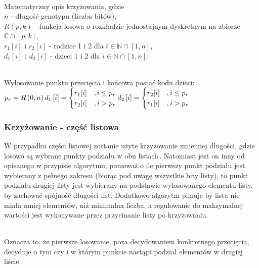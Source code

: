 \noindent\\
Matematyczny opis krzyżowania, gdzie\\
$n$ - długość genotypu (liczba bitów),\\
$R\left(p, k\right)$ - funkcja losowa o rozkładzie jednostajnym dyskretnym
  na zbiorze $\mathbb{C} \cap \left[p, k\right]$,\\
$r_1\left[i\right]$ i $r_2\left[i\right]$ -
  rodzice 1 i 2 dla
  $i \in \mathbb{N} \cap \left[1, n\right]$,\\
$d_1\left[i\right]$ i $d_2\left[i\right]$ -
  dzieci 1 i 2 dla
  $i \in \mathbb{N} \cap \left[1, n\right]$:

\noindent\\
Wylosowanie punktu przecięcia i końcowa postać kodu dzieci:\\
$\displaystyle
  p_r=R\left(0, n\right)\\
  d_1\left[i\right]=\begin{cases}
    r_1[i]
      &, i \le p_r\\
    r_2[i]
      &, i>p_r\\
  \end{cases}\\
  d_2\left[i\right]=\begin{cases}
    r_2[i]
      &, i \le p_r\\
    r_1[i]
      &, i>p_r\\
  \end{cases}
$

\subsubsection{Krzyżowanie - część listowa}
W przypadku części listowej zostanie użyte krzyżowanie zmiennej długości,
gdzie losowo są wybrane punkty podziału w obu listach\,.
Natomiast jest on inny od opisanego w przypisie algorytmu,
ponieważ o ile pierwszy punkt podziału jest wybierany z pełnego zakresu
(biorąc pod uwagę wszystkie bity listy),
to punkt podziału drugiej listy jest wybierany na podstawie
wylosowanego elementu listy, by zachować spójność długości list.
Dodatkowo algorytm pilnuje by lista nie miała mniej elementów,
niż minimalna liczba, a regulowanie do maksymalnej wartości
jest wykonywane przez przycinanie listy po krzyżowaniu.

\noindent\\
Oznacza to, że pierwsze losowanie,
poza decydowaniem konkretnego przecięcia, decyduje o tym czy
i w którym punkcie nastąpi podział elementów w drugiej liście.

